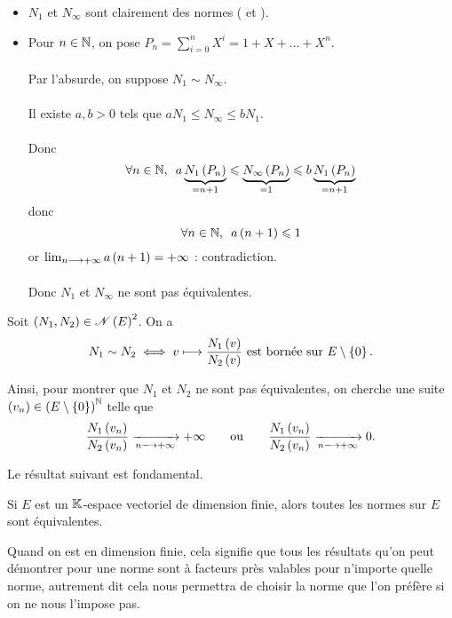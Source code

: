 \begin{corr}
\begin{itemize}
    \item \(N_1\) et \(N_\infty\) sont clairement des normes (\cf {} et ). \\
    \item Pour \(n\in\mathbb{N}\), on pose \(P_n=\sum_{i=0}^nX^i=1+X+\dots+X^n\). \\\\ Par l'absurde, on suppose \(N_1\sim N_\infty\). \\\\ Il existe \(a,b>0\) tels que \(aN_1\leq N_\infty\leq bN_1\). \\\\ Donc \[\quantifs{\forall n\in\N}a\underbrace{N_1\paren{P_n}}_{=n+1}\leq \underbrace{N_\infty\paren{P_n}}_{=1}\leq b\underbrace{N_1\paren{P_n}}_{=n+1}\] donc \[\quantifs{\forall n\in\N}a\paren{n+1}\leq1\] or \(\lim_{n\longrightarrow+\infty}a\left(n+1\right)=+\infty\) : contradiction. \\\\ Donc \(N_1\) et \(N_\infty\) ne sont pas équivalentes.
\end{itemize}
\end{corr}

\begin{rem}
Soit \(\left(N_1,N_2\right)\in\mathscr{N}\left(E\right)^2\). On a \[N_1\sim N_2\iff v\longmapsto\dfrac{N_1\left(v\right)}{N_2\left(v\right)}\text{ est bornée sur }E\setminus\left\lbrace0\right\rbrace.\]

Ainsi, pour montrer que \(N_1\) et \(N_2\) ne sont pas équivalentes, on cherche une suite \(\left(v_n\right)\in\left(E\setminus\left\lbrace0\right\rbrace\right)^{\mathbb{N}}\) telle que \[\dfrac{N_1\left(v_n\right)}{N_2\left(v_n\right)}\xrightarrow[n\longrightarrow+\infty]{}+\infty\qquad\text{ou}\qquad\dfrac{N_1\left(v_n\right)}{N_2\left(v_n\right)}\xrightarrow[n\longrightarrow+\infty]{}0.\]
\end{rem}

Le résultat suivant est fondamental.

\begin{theo}
Si \(E\) est un \(\mathbb{K}\)-espace vectoriel de dimension finie, alors toutes les normes sur \(E\) sont équivalentes.
\end{theo}

Quand on est en dimension finie, cela signifie que tous les résultats qu'on peut démontrer pour une norme sont à facteurs près valables pour n'importe quelle norme, autrement dit cela nous permettra de choisir la norme que l'on préfère si on ne nous l'impose pas.

